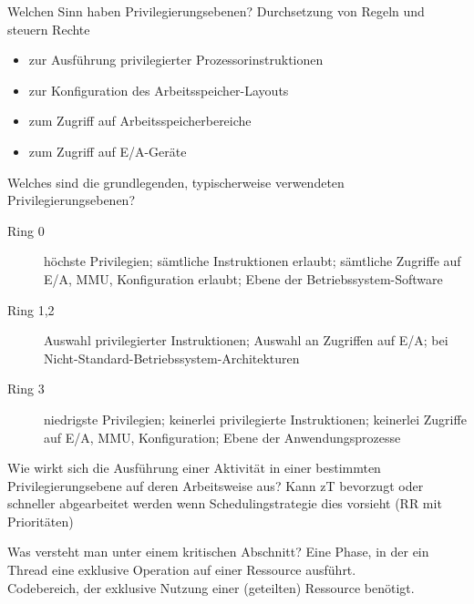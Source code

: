 \documentclass[avery5371]{flashcards}
\begin{document}
\begin{flashcard}[Privilegierungsebenen]{Welchen Sinn haben Privilegierungsebenen?}
    Durchsetzung von Regeln und steuern Rechte
    \begin{itemize}
        \item zur Ausführung privilegierter Prozessorinstruktionen
        \item zur Konfiguration des Arbeitsspeicher-Layouts
        \item zum Zugriff auf Arbeitsspeicherbereiche
        \item zum Zugriff auf E/A-Geräte
    \end{itemize}
\end{flashcard}

\begin{flashcard}[Privilegierungsebenen]{Welches sind die grundlegenden, typischerweise verwendeten Privilegierungsebenen?}
    \begin{description}
        \item[Ring 0] höchste Privilegien; sämtliche Instruktionen erlaubt; sämtliche Zugriffe auf E/A, MMU, Konfiguration erlaubt; Ebene der Betriebssystem-Software
        \item[Ring 1,2] Auswahl privilegierter Instruktionen; Auswahl an Zugriffen auf E/A; bei Nicht-Standard-Betriebssystem-Architekturen
        \item[Ring 3] niedrigste Privilegien; keinerlei privilegierte Instruktionen; keinerlei Zugriffe auf E/A, MMU, Konfiguration; Ebene der Anwendungsprozesse
    \end{description}
\end{flashcard}

\begin{flashcard}[Privilegierungsebenen]{Wie wirkt sich die Ausführung einer Aktivität in einer bestimmten Privilegierungsebene auf deren Arbeitsweise aus?}
    Kann zT bevorzugt oder schneller abgearbeitet werden wenn Schedulingstrategie dies vorsieht (RR mit Prioritäten)
\end{flashcard}

\begin{flashcard}{Was versteht man unter einem kritischen Abschnitt?}
    Eine Phase, in der ein Thread eine exklusive Operation auf einer Ressource ausführt.\\
    Codebereich, der exklusive Nutzung einer (geteilten) Ressource benötigt.
\end{flashcard}
\end{document}
